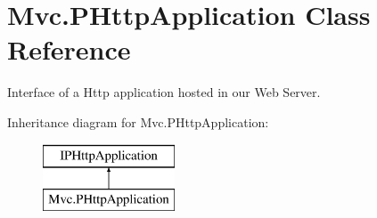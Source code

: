 \hypertarget{class_mvc_1_1_p_http_application}{}\section{Mvc.\+P\+Http\+Application Class Reference}
\label{class_mvc_1_1_p_http_application}


Interface of a Http application hosted in our Web Server.  


Inheritance diagram for Mvc.\+P\+Http\+Application\+:\begin{figure}[H]
\begin{center}
\leavevmode
\includegraphics[height=2.000000cm]{class_mvc_1_1_p_http_application}
\end{center}
\end{figure}
